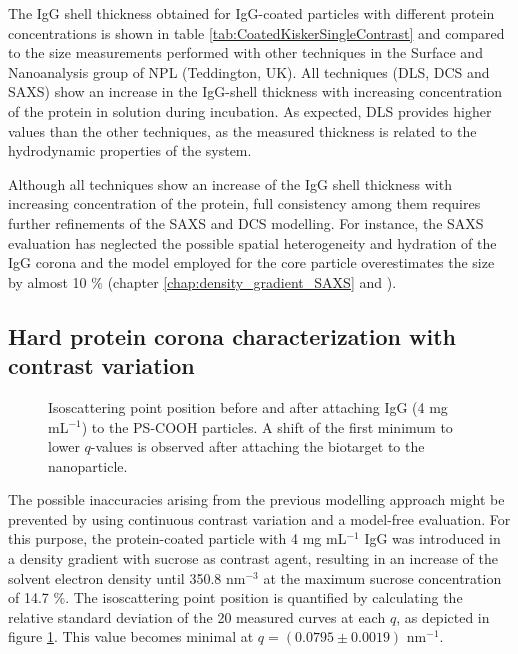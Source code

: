 The IgG shell thickness obtained for IgG-coated particles with different protein concentrations is shown in table \ref{tab:CoatedKiskerSingleContrast} and compared to the size measurements performed with other techniques in the Surface and Nanoanalysis group of NPL (Teddington, UK). All techniques (DLS, DCS and SAXS) show an increase in the IgG-shell thickness with increasing concentration of the protein in solution during incubation. As expected, DLS provides higher values than the other techniques, as the measured thickness is related to the hydrodynamic properties of the system.

Although all techniques show an increase of the IgG shell thickness with increasing concentration of the protein, full consistency among them requires further refinements of the SAXS and DCS modelling. For instance, the SAXS evaluation has neglected the possible spatial heterogeneity and hydration of the IgG corona and the model employed for the core particle overestimates the size by almost 10 $\%$ (chapter \ref{chap:density_gradient_SAXS} and \cite{minelli_characterization_2014}).

\subsection{Hard protein corona characterization with contrast variation}
\label{sec:coated_kisker_continuous}

\begin{figure}
	\centering
		
		\caption[Isoscattering point position before and after attaching IgG.]{Isoscattering point position before and after attaching IgG (4 mg mL$^{-1}$) to the PS-COOH particles. A shift of the first minimum to lower $q$-values is observed after attaching the biotarget to the nanoparticle.}
		\label{fig:CoatedKiskerIsopointComp}
\end{figure}

The possible inaccuracies arising from the previous modelling approach might be prevented by using continuous contrast variation and a model-free evaluation. For this purpose, the protein-coated particle with 4 mg mL$^{-1}$ IgG was introduced in a density gradient with sucrose as contrast agent, resulting in an increase of the solvent electron density until 350.8 nm$^{-3}$ at the maximum sucrose concentration of 14.7 $\%$. The isoscattering point position is quantified by calculating the relative standard deviation of the 20 measured curves at each $q$, as depicted in figure \ref{fig:CoatedKiskerIsopointComp}. This value becomes minimal at $q = \left( 0.0795\pm0.0019 \right)$ nm$^{-1}$.

